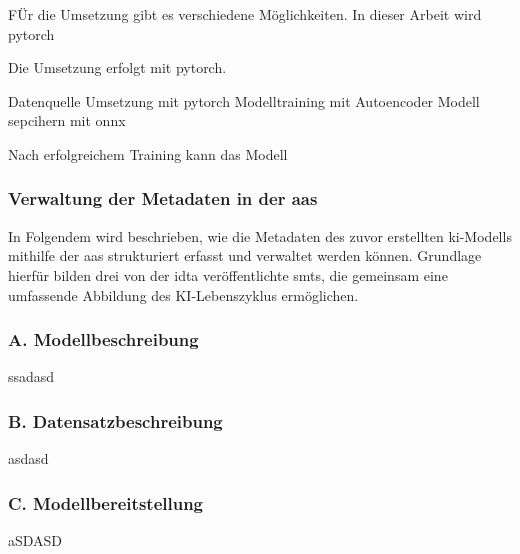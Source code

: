 FÜr die Umsetzung gibt es verschiedene Möglichkeiten. In dieser Arbeit wird pytorch 




Die Umsetzung erfolgt mit pytorch.




Datenquelle
Umsetzung mit pytorch
Modelltraining mit Autoencoder
Modell sepcihern mit onnx

Nach erfolgreichem Training kann das Modell 

\subsubsection{Verwaltung der Metadaten in der \acs{aas}}
In Folgendem wird beschrieben, wie die Metadaten des zuvor erstellten \acs{ki}-Modells mithilfe der \acs{aas} strukturiert erfasst und verwaltet werden können. 
Grundlage hierfür bilden drei von der \acs{idta} veröffentlichte \acsp{smt}, die gemeinsam eine umfassende Abbildung des KI-Lebenszyklus ermöglichen.

\subsubsection*{A. Modellbeschreibung}
ssadasd
\subsubsection*{B. Datensatzbeschreibung}
asdasd
\subsubsection*{C. Modellbereitstellung}
aSDASD